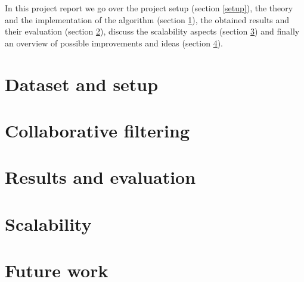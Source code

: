 \documentclass[11pt,a4paper]{article}
\begin{document}
\begin{multicols}{2}
In this project report we go over the project setup (section \ref{setup}), the theory and the implementation of the algorithm (section \ref{collabfiltering}), the obtained results and their evaluation (section \ref{evaluation}), discuss the scalability aspects (section \ref{scalability}) and finally an overview of possible improvements and ideas (section \ref{futurework}).



\label{setup}
\section{Dataset and setup}



\label{collabfiltering}
\section{Collaborative filtering}



\label{evaluation}
\section{Results and evaluation}



\label{scalability}
\section{Scalability}



\label{futurework}
\section{Future work}


\end{multicols}
\end{document}
